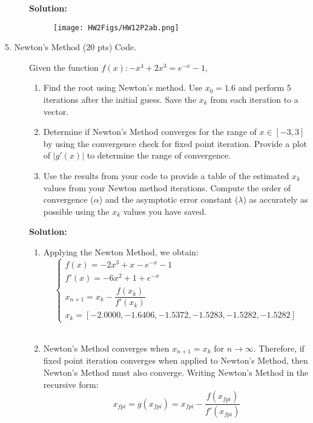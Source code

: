 \documentclass[12pt]{article}
\begin{document}
\begin{description}
\ifsolution
\color{red}
{\bf Solution:}\\
\begin{figure}[ht]
	\centering\texttt{[image: HW2Figs/HW12P2ab.png]}
\label{fig:5ab}
\end{figure}
\color{black}
\fi
	

\item[5. Newton's Method (20 pts) Code.] Given the function $f(x): -x^4 + 2x^3 = e^{-x} - 1$,
	\begin{enumerate} [label=(\alph*)]
		\item Find the root using Newton's method. Use $x_0 = 1.6$ and perform 5 iterations after the initial guess. Save the $x_k$ from each iteration to a vector.
		\item 	Determine if Newton's Method converges for the range of $x \in [-3,3]$ by using the convergence check for fixed point iteration. Provide a plot of $|g'(x)|$ to determine the range of convergence.
		\item Use the results from your code to provide a table of the estimated $x_k$ values from your Newton method iterations. Compute the order of convergence ($\alpha$) and the asymptotic error constant ($\lambda$) as accurately as possible using the $x_k$ values you have saved.
	\end{enumerate}

\ifsolution
\color{red}
        {\bf Solution:}\\
        \begin{enumerate} [label=(\alph*)]
        	
        	\item Applying the Newton Method, we obtain: \\
        	\begin{equation*}
        	\begin{cases}
        	    f(x) = -2x^3 + x - e^{-x} - 1 \\
        		f'(x) = -6x^2 + 1 + e^{-x} \\
        	    x_{n+1} = x_k-\dfrac{f(x_k)}{f'(x_k)} \\
     		    x_k = [-2.0000, -1.6406, -1.5372, -1.5283, -1.5282, -1.5282]
     		\end{cases}
     		\end{equation*}
        		\\
        	
        		
	        \item Newton's Method converges when $x_{n+1} = x_k$ for $n \rightarrow \infty$. Therefore, if fixed point iteration converges when applied to Newton's Method, then Newton's Method must also converge.  Writing Newton's Method in the recursive form:
	        \begin{equation*}
	        	x_{fpi} = g(x_{fpi}) = x_{fpi}-\frac{f(x_{fpi})}{f'(x_{fpi})}
	        \end{equation*}
	        	

\end{enumerate}
\end{description}
\end{document}
